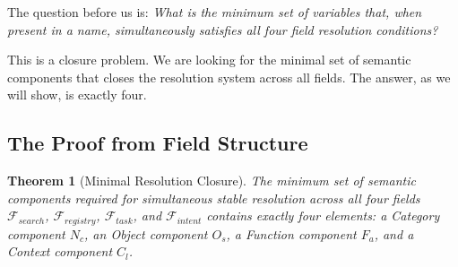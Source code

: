 \documentclass[12pt, openany]{book}
\theoremstyle{thmstyle}
\newtheorem{theorem}{Theorem}[chapter]
\theoremstyle{defstyle}
\newcommand{\Nc}{N_c}
\newcommand{\Os}{O_s}
\newcommand{\Fa}{F_a}
\newcommand{\Cl}{C_l}
\begin{document}
The question before us is: \textit{What is the minimum set of variables that, when present in a name, simultaneously satisfies all four field resolution conditions?}

This is a closure problem. We are looking for the minimal set of semantic components that closes the resolution system across all fields. The answer, as we will show, is exactly four.

\subsection{The Proof from Field Structure}

\begin{theorem}[Minimal Resolution Closure]
The minimum set of semantic components required for simultaneous stable resolution across all four fields $\mathcal{F}_{search}$, $\mathcal{F}_{registry}$, $\mathcal{F}_{task}$, and $\mathcal{F}_{intent}$ contains exactly four elements: a Category component $\Nc$, an Object component $\Os$, a Function component $\Fa$, and a Context component $\Cl$.
\end{theorem}
\end{document}
